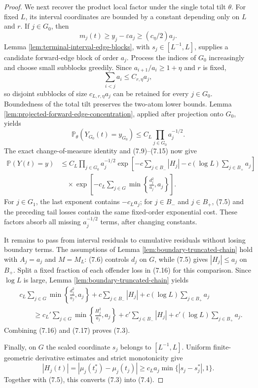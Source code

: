 \documentclass[11pt]{article}
\theoremstyle{remark}
\newcommand{\Pp}{\mathbb P}
\begin{document}
\begin{proof}
We next recover the product local factor under the single total tilt $\theta$.
For fixed $L$, its interval coordinates are bounded by a constant depending
only on $L$ and $r$.  If $j\in G_0$, then
\[
        m_j(t)\ge y_j-\varepsilon a_j\ge(c_\eta/2)a_j.
\]
Lemma \ref{lem:terminal-interval-edge-blocks}, with
$s_j\in[L^{-1},L]$, supplies a candidate forward-edge block of order $a_j$.
Process the indices of $G_0$ increasingly and choose small subblocks greedily.
Since $a_{i+1}/a_i\ge1+\eta$ and $r$ is fixed,
\[
        \sum_{i<j}a_i\le C_{r,\eta}a_j,
\]
so disjoint subblocks of size $c_{L,r,\eta}a_j$ can be retained for every
$j\in G_0$.  Boundedness of the total tilt preserves the two-atom lower
bounds.  Lemma \ref{lem:projected-forward-edge-concentration}, applied after
projection onto $G_0$, yields
\[
        \Pp_\theta(Y_{G_0}(t)=y_{G_0})
        \le C_L\prod_{j\in G_0}a_j^{-1/2}.
        \tag{7.15}
\]
The exact change-of-measure identity and (7.9)--(7.15) now give
\[
\begin{aligned}
\Pp(Y(t)=y)
&\le C_L\prod_{j\in G_0}a_j^{-1/2}
 \exp\left[-c\sum_{j\in B_-}|H_j|
            -c(\log L)\sum_{j\in B_+}a_j\right]\\
&\quad\times
 \exp\left[-c_L\sum_{j\in G}
 \min\left\{\frac{d_j^2}{a_j},a_j\right\}\right].
\end{aligned}\tag{7.16}
\]
For $j\in G_1$, the last exponent contains $-c_La_j$; for $j\in B_-$ and
$j\in B_+$, (7.5) and the preceding tail losses contain the same fixed-order
exponential cost.  These factors absorb all missing $a_j^{-1/2}$ terms, after
changing constants.

It remains to pass from interval residuals to cumulative residuals without
losing boundary terms.  The assumptions of Lemma
\ref{lem:boundary-truncated-chain} hold with $A_j=a_j$ and $M=M_L$: (7.6)
controls $d_j$ on $G$, while (7.5) gives $|H_j|\le a_j$ on $B_+$.  Split a
fixed fraction of each offender loss in (7.16) for this comparison.  Since
$\log L$ is large, Lemma \ref{lem:boundary-truncated-chain} yields
\[
\begin{aligned}
&c_L\sum_{j\in G}\min\left\{\frac{d_j^2}{a_j},a_j\right\}
 +c\sum_{j\in B_-}|H_j|
 +c(\log L)\sum_{j\in B_+}a_j\\
&\qquad\ge
 c_L'\sum_{j\in G}\min\left\{\frac{H_j^2}{a_j},a_j\right\}
 +c'\sum_{j\in B_-}|H_j|
 +c'(\log L)\sum_{j\in B_+}a_j.
\end{aligned}
\tag{7.17}
\]
Combining (7.16) and (7.17) proves (7.3).

Finally, on $G$ the scaled coordinate $s_j$ belongs to $[L^{-1},L]$.
Uniform finite-geometric derivative estimates and strict monotonicity give
\[
        |H_j(t)|=|\mu_j(t_j^*)-\mu_j(t_j)|
        \ge c_La_j\min\{|s_j-s_j^*|,1\}.
        \tag{7.18}
\]
Together with (7.5), this converts (7.3) into (7.4).
\end{proof}
\end{document}
